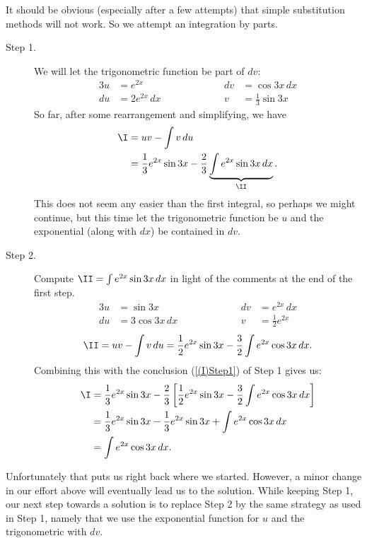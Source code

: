 It should be obvious (especially after a
few attempts) that simple substitution methods will not work.
So we attempt an integration by parts.
\begin{description}
\item[Step 1.]  We will let the trigonometric function be part of $dv$:
\begin{alignat*}{3}
u&=e^{2x}&&\qquad\qquad&dv&=\cos3x\,dx\\
du&=2e^{2x}\,dx&&&v&=\frac13\sin3x
\end{alignat*}
So far, after some rearrangement and simplifying, we have
\begin{align}\I&=uv-\int v\,du\notag\\
&=\frac13e^{2x}\sin3x-\frac23
\underbrace{\int e^{2x}\sin 3x\,dx}_{\II}.\label{(I)Step1}\end{align}
This does not seem any easier than the first integral, so 
perhaps we might continue, but this time let the trigonometric 
function
be $u$ and the exponential (along with $dx$) be contained in $dv$.
\item[Step 2.] Compute $\II=\int e^{2x}\sin3x\,dx$ 
 in light of the comments at the end of the first step.
\begin{alignat*}{3}
u&=\sin3x&&\qquad\qquad&dv&=e^{2x}\,dx\\
du&=3\cos3x\,dx&&&v&=\frac12e^{2x}\end{alignat*}
$$\II=uv-\int v\,du=\frac12e^{2x}\sin3x-\frac32\int e^{2x}\cos3x\,dx.$$
Combining this with the conclusion (\ref{(I)Step1}) of Step 1 gives us:
\begin{align*}
\I&=\frac13e^{2x}\sin3x-\frac23\left[
        \frac12e^{2x}\sin3x-\frac32\int e^{2x}\cos3x\,dx\right]\\
  &=\frac13e^{2x}\sin3x-\frac13e^{2x}\sin3x+\int e^{2x}\cos3x\,dx\\
  &=\int e^{2x}\cos3x\,dx.
\end{align*}
\end{description}
Unfortunately that puts us right back where we started.
However, a minor change in our effort above will eventually lead us to 
the solution.  While keeping Step 1,
our next step towards a solution is to replace Step 2
by the same strategy as used in Step 1, namely that we 
use the exponential function for $u$ and the trigonometric with  $dv$.
